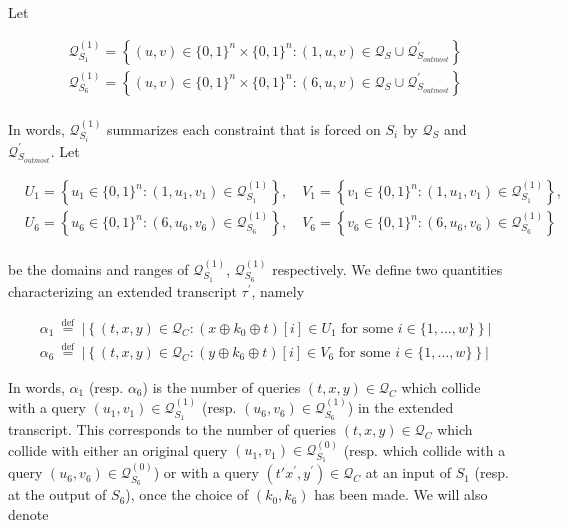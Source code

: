 \noindent Let

$$
\begin{aligned}
&\mathcal{Q}_{S_{1}}^{(1)}=\left\{(u, v) \in\{0,1\}^{n} \times\{0,1\}^{n}:(1, u, v) \in \mathcal{Q}_{S} \cup \mathcal{Q}_{S_{outmost}}^{\prime}\right\}\\
&\mathcal{Q}_{S_{6}}^{(1)}=\left\{(u, v) \in\{0,1\}^{n} \times\{0,1\}^{n}:(6, u, v) \in \mathcal{Q}_{S} \cup \mathcal{Q}_{S_{outmost}}^{\prime}\right\}\\
\end{aligned}
$$

\noindent In words, $\mathcal{Q}_{S_{i}}^{(1)}$ summarizes each constraint that is forced on $S_{i}$ by $\mathcal{Q}_{S}$ and $\mathcal{Q}_{S_{outmost}}^{\prime}$. Let

$$
\begin{aligned}
&U_{1}=\left\{u_{1} \in\{0,1\}^{n}:\left(1, u_{1}, v_{1}\right) \in \mathcal{Q}_{S_{1}}^{(1)}\right\}, \quad V_{1}=\left\{v_{1} \in\{0,1\}^{n}:\left(1, u_{1}, v_{1}\right) \in \mathcal{Q}_{S_{1}}^{(1)}\right\},\\
&U_{6}=\left\{u_{6} \in\{0,1\}^{n}:\left(6, u_{6}, v_{6}\right) \in \mathcal{Q}_{S_{6}}^{(1)}\right\}, \quad V_{6}=\left\{v_{6} \in\{0,1\}^{n}:\left(6, u_{6}, v_{6}\right) \in \mathcal{Q}_{S_{6}}^{(1)}\right\}\\
\end{aligned}
$$

\noindent be the domains and ranges of $\mathcal{Q}_{S_{1}}^{(1)}$, $\mathcal{Q}_{S_{6}}^{(1)}$ respectively. We define two quantities characterizing an extended transcript $\tau^{\prime}$, namely

$$
\begin{aligned}
&\alpha_{1} \stackrel{\text { def }}{=} |\left\{(t, x, y) \in \mathcal{Q}_{C}: \left(x \oplus k_{0} \oplus t\right)[i] \in U_{1} \text { for some } i \in\{1, \ldots, w\}\right\} |\\
&\alpha_{6} \stackrel{\text { def }}{=} |\left\{(t, x, y) \in \mathcal{Q}_{C}: \left(y \oplus k_{6} \oplus t\right)[i] \in V_{6} \text { for some } i \in\{1, \ldots, w\}\right\} |
\end{aligned}
$$

In words, $\alpha_1$ (resp. $\alpha_6$) is the number of queries $(t, x, y) \in \mathcal{Q}_{C}$ which collide with a query $\left(u_{1}, v_{1}\right) \in \mathcal{Q}_{S_{1}}^{(1)}$ (resp. $\left(u_{6}, v_{6}\right) \in \mathcal{Q}_{S_{6}}^{(1)}$) in the extended transcript. This corresponds to the number of queries $(t, x, y) \in \mathcal{Q}_{C}$ which collide with either an original query $\left(u_{1}, v_{1}\right) \in \mathcal{Q}_{S_{1}}^{(0)}$ (resp. which collide with a query $\left(u_{6}, v_{6}\right) \in \mathcal{Q}_{S_{6}}^{(0)}$) or with a query $\left(t' x^{\prime}, y^{\prime}\right) \in \mathcal{Q}_{C}$ at an input of $S_1$ (resp. at the output of $S_6$), once the choice of $\left(k_{0}, k_{6}\right)$  has been made. We will also denote

